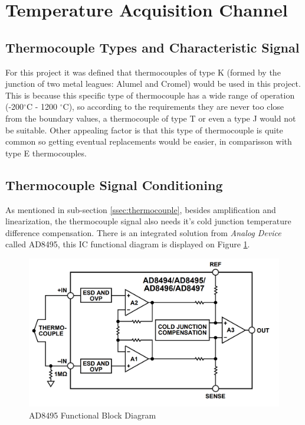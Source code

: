 \section{Temperature Acquisition Channel}\label{sec:temperatura-acquisition-channel}

	\subsection{Thermocouple Types and Characteristic Signal}\label{ssec:thermocouple-types-characteristic-signal}	
			
	 For this project it was defined that thermocouples of type K (formed by the junction of two metal leagues: Alumel and Cromel) would be used in this project. This is because this specific type of thermocouple has a wide range of operation (-200$^{\circ}$C - 1200 $^{\circ}$C), so according to the requirements they are never too close from the boundary values, a thermocouple of type T or even a type J would not be suitable. Other appealing factor is that this type of thermocouple is quite common so getting eventual replacements would be easier, in comparisson with type E thermocouples.

	\subsection{Thermocouple Signal Conditioning}\label{ssec:thermocouple-signal-conditioning}
	
	As mentioned in sub-section \ref{ssec:thermocouple}, besides amplification and linearization, the thermocouple signal also needs it's cold junction temperature difference compensation. There is an integrated solution from \textit{Analog Device} called AD8495, this IC functional diagram is displayed on Figure \ref{fig:ad8495-functional-block}.
	
		\begin{figure}[htbp]
			\centering
				\includegraphics[scale=0.65]{figuras/fig-ad8495-functional-block}
			\caption{AD8495 Functional Block Diagram \cite{ad8495-functional-block}}
			\label{fig:ad8495-functional-block}
		\end{figure}
		
